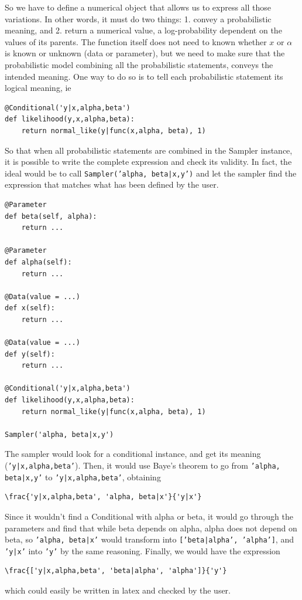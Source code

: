 \documentclass[]{book}
\begin{document}
So we have to define a numerical object that allows us to express all those variations. In other words, it must do two things: 1. convey a probabilistic meaning, and 2. return a numerical value, a log-probability dependent on the values of its parents. The function itself does not need to known whether $x$ or $\alpha $ is known or unknown (data or parameter), but we need to make sure that the probabilistic model combining all the probabilistic statements, conveys the intended meaning. One way to do so is to tell each probabilistic statement its logical meaning, ie
\begin{verbatim}
@Conditional('y|x,alpha,beta')
def likelihood(y,x,alpha,beta):
    return normal_like(y|func(x,alpha, beta), 1)
\end{verbatim}
So that when all probabilistic statements are combined in the Sampler instance, it is possible to write the complete expression and check its validity. In fact, the ideal would be to call
\texttt{Sampler('alpha, beta|x,y')} and let the sampler find the expression that matches what has been defined by the user.

\begin{verbatim}
@Parameter
def beta(self, alpha):
    return ...

@Parameter
def alpha(self):
    return ...

@Data(value = ...)
def x(self):
    return ...

@Data(value = ...)
def y(self):
    return ...

@Conditional('y|x,alpha,beta')
def likelihood(y,x,alpha,beta):
    return normal_like(y|func(x,alpha, beta), 1)

Sampler('alpha, beta|x,y')
\end{verbatim}
The sampler would look for a conditional instance, and get its meaning (\texttt{'y|x,alpha,beta'}). Then, it would use Baye's theorem to go from \texttt{'alpha, beta|x,y'} to \texttt{'y|x,alpha,beta'}, obtaining
\begin{verbatim}\frac{'y|x,alpha,beta', 'alpha, beta|x'}{'y|x'}\end{verbatim}
Since it wouldn't find a Conditional with alpha or beta, it would go through the parameters and find that while beta depends on alpha, alpha does not depend on beta, so \texttt{'alpha, beta|x'} would transform into \texttt{['beta|alpha', 'alpha']}, and \texttt{'y|x'} into \texttt{'y'} by the same reasoning. Finally, we would have the expression
\begin{verbatim}\frac{['y|x,alpha,beta', 'beta|alpha', 'alpha']}{'y'}\end{verbatim} which could easily be written in latex and checked by the user.
\end{document}
